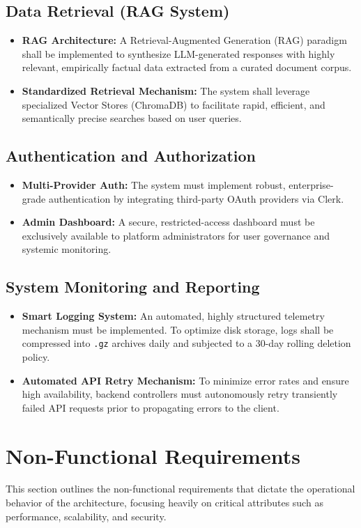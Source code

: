 \subsection{Data Retrieval (RAG System)}
\begin{itemize}
    \item \textbf{RAG Architecture:} A Retrieval-Augmented Generation (RAG) paradigm shall be implemented to synthesize LLM-generated responses with highly relevant, empirically factual data extracted from a curated document corpus.
    \item \textbf{Standardized Retrieval Mechanism:} The system shall leverage specialized Vector Stores (ChromaDB) to facilitate rapid, efficient, and semantically precise searches based on user queries.
\end{itemize}

\subsection{Authentication and Authorization}
\begin{itemize}
    \item \textbf{Multi-Provider Auth:} The system must implement robust, enterprise-grade authentication by integrating third-party OAuth providers via Clerk.
    \item \textbf{Admin Dashboard:} A secure, restricted-access dashboard must be exclusively available to platform administrators for user governance and systemic monitoring.
\end{itemize}

\subsection{System Monitoring and Reporting}
\begin{itemize}
    \item \textbf{Smart Logging System:} An automated, highly structured telemetry mechanism must be implemented. To optimize disk storage, logs shall be compressed into \texttt{.gz} archives daily and subjected to a 30-day rolling deletion policy.
    \item \textbf{Automated API Retry Mechanism:} To minimize error rates and ensure high availability, backend controllers must autonomously retry transiently failed API requests prior to propagating errors to the client.
\end{itemize}

\section{Non-Functional Requirements}
This section outlines the non-functional requirements that dictate the operational behavior of the architecture, focusing heavily on critical attributes such as performance, scalability, and security.

